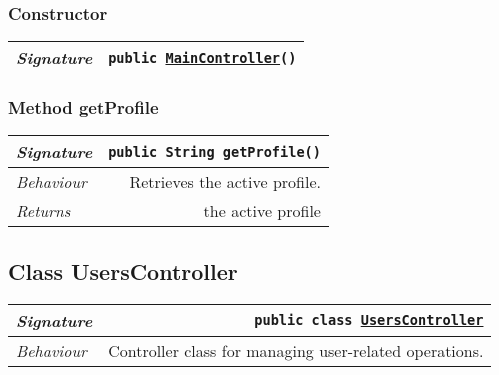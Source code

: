 \begin{adjustwidth}{1.5em}{0pt}
\begin{adjustwidth}{1.5em}{0pt}
{\begin{tabularx}{1.0\linewidth}{@{}l R@{}}
    \end{tabularx}}\subsubsection{Constructor\label{edu.kit.hci.soli.controller.MainController@edu.kit.hci.soli.controller.MainController()}}
    \begin{adjustwidth}{1.5em}{0pt}
      {\begin{tabularx}{1.0\linewidth}{@{}l R@{}}
        \emph{Signature} & \texttt{public \texttt{\hyperref[edu.kit.hci.soli.controller.MainController]{\texttt{MainController}}}()} \\
        \hline
  
      \end{tabularx}}
    \end{adjustwidth}\subsubsection{Method getProfile\label{edu.kit.hci.soli.controller.MainController@getProfile()}}
    \begin{adjustwidth}{1.5em}{0pt}
      {\begin{tabularx}{1.0\linewidth}{@{}l R@{}}
        \emph{Signature} & \texttt{public \texttt{String} getProfile()} \\
        \hline
        \emph{Behaviour} & Retrieves the active profile.    \\
        \hline
        \emph{Returns} & the active profile  \\
        \hline
  
      \end{tabularx}}
    \end{adjustwidth}
  \end{adjustwidth}\subsection{Class UsersController\label{edu.kit.hci.soli.controller.UsersController} }
  \begin{adjustwidth}{1.5em}{0pt}
    {\begin{tabularx}{1.0\linewidth}{@{}l R@{}}
      \emph{Signature} & \texttt{public  class \texttt{\hyperref[edu.kit.hci.soli.controller.UsersController]{\texttt{UsersController}}}} \\
      \hline
      \emph{Behaviour} & Controller class for managing user-related operations.  \\
      \hline
  

\end{tabularx}}
\end{adjustwidth}
\end{adjustwidth}
